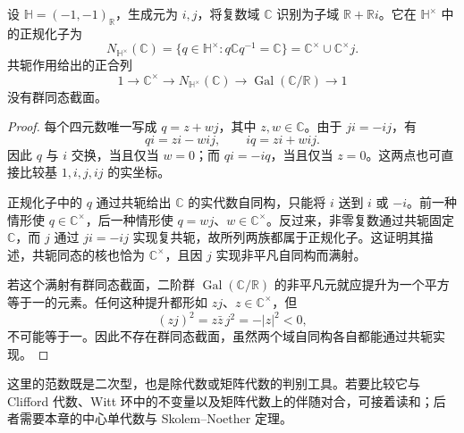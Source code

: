 \begin{proposition}\label{b2:prop:quaternion-normalizer-nonsplit}
	设 \(\mathbb H=(-1,-1)_{\mathbb R}\)，生成元为 \(i,j\)，将复数域 \(\mathbb C\) 识别为子域 \(\mathbb R+\mathbb R i\)。它在 \(\mathbb H^\times\) 中的正规化子为
	\[
		N_{\mathbb H^\times}(\mathbb C) =\{q\in\mathbb H^\times:q\mathbb Cq^{-1}=\mathbb C\} =\mathbb C^\times\cup\mathbb C^\times j.
	\]
	共轭作用给出的正合列
	\[
		1\longrightarrow\mathbb C^\times \longrightarrow N_{\mathbb H^\times}(\mathbb C) \longrightarrow\operatorname{Gal}(\mathbb C/\mathbb R) \longrightarrow1
	\]
	没有群同态截面。
\end{proposition}
\begin{proof}
	每个四元数唯一写成 \(q=z+w j\)，其中 \(z,w\in\mathbb C\)。由于 \(ji=-ij\)，有
	\[
		qi=zi-wij,\qquad iq=zi+wij.
	\]
	因此 \(q\) 与 \(i\) 交换，当且仅当 \(w=0\)；而 \(qi=-iq\)，当且仅当 \(z=0\)。这两点也可直接比较基 \(1,i,j,ij\) 的实坐标。

	正规化子中的 \(q\) 通过共轭给出 \(\mathbb C\) 的实代数自同构，只能将 \(i\) 送到 \(i\) 或 \(-i\)。前一种情形使 \(q\in\mathbb C^\times\)，后一种情形使 \(q=w j\)、\(w\in\mathbb C^\times\)。反过来，非零复数通过共轭固定 \(\mathbb C\)，而 \(j\) 通过 \(ji=-ij\) 实现复共轭，故所列两族都属于正规化子。这证明其描述，共轭同态的核也恰为 \(\mathbb C^\times\)，且因 \(j\) 实现非平凡自同构而满射。

	若这个满射有群同态截面，二阶群 \(\operatorname{Gal}(\mathbb C/\mathbb R)\) 的非平凡元就应提升为一个平方等于一的元素。任何这种提升都形如 \(zj\)、\(z\in\mathbb C^\times\)，但
	\[
		(zj)^2=z\bar z\,j^2=-|z|^2<0,
	\]
	不可能等于一。因此不存在群同态截面，虽然两个域自同构各自都能通过共轭实现。
\end{proof}

这里的范数既是二次型，也是除代数或矩阵代数的判别工具。若要比较它与 Clifford 代数、Witt 环中的不变量以及矩阵代数上的伴随对合，可接着读和；后者需要本章的中心单代数与 Skolem--Noether 定理。
